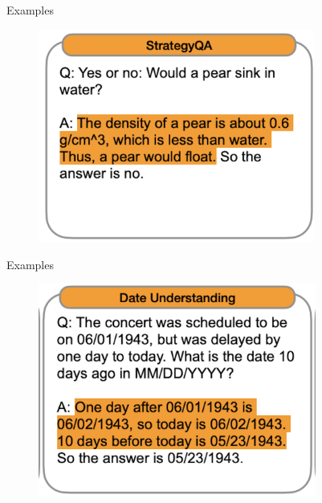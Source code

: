 
\begin{vbframe}{Examples}

\vfill

\begin{figure}
    \centering
    \includegraphics[height=7cm]{figure/cotex1.png}
\end{figure}

\vfill

\end{vbframe}

\begin{vbframe}{Examples}

\vfill

\begin{figure}
    \centering
    \includegraphics[height=7cm]{figure/cotex2.png}
\end{figure}

\vfill

\end{vbframe}

